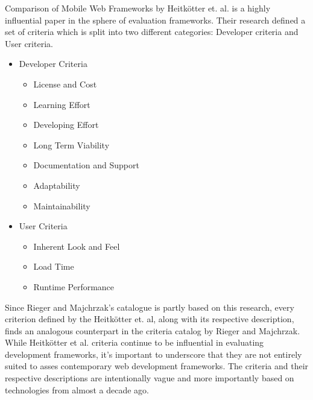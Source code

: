 Comparison of Mobile Web Frameworks by Heitkötter et. al. is a highly influential paper in the sphere of evaluation frameworks. Their research defined a set of criteria which is split into two different categories:  Developer criteria and User criteria. 
\begin{itemize}
    \item Developer Criteria
    \begin{itemize}
        \item License and Cost
        \item Learning Effort
        \item Developing Effort
        \item Long Term Viability
        \item Documentation and Support
        \item Adaptability
        \item Maintainability
    \end{itemize}
    \item User Criteria
    \begin{itemize}
        \item Inherent Look and Feel
        \item Load Time
        \item Runtime Performance
    \end{itemize}
\end{itemize}
Since Rieger and Majchrzak's catalogue is partly based on this research, every criterion defined by the Heitkötter et. al, along with its respective description, finds an analogous counterpart in the criteria catalog by Rieger and Majchrzak. While Heitkötter et al. criteria continue to be influential in evaluating development frameworks, it's important to underscore that they are not entirely suited to asses contemporary web development frameworks. The criteria and their respective descriptions are intentionally vague and more importantly based on technologies from almost a decade ago.


